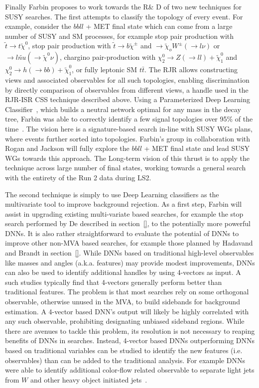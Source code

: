 Finally Farbin proposes to work towards the R\& D of two new
techniques for SUSY searches. The first attempts to classify the
topology of every event. For example, consider the $bb ll$ + MET final
state which can come from a large number of SUSY and SM processes, for
example stop pair production with $\tilde{t} \rightarrow t
\tilde{\chi}^0$, stop pair production with $\tilde{t} \rightarrow b
\tilde{\chi}^\pm$ and $\rightarrow \tilde{\chi}_o W^\pm (\rightarrow l
\nu)$ or $\rightarrow l \tilde{nu} (\rightarrow \tilde{\chi}^0 \nu)$,
chargino pair-production with $\chi_2^0\rightarrow Z (\rightarrow ll)
+ \tilde{\chi}^0_1$ and $\chi_2^0\rightarrow h (\rightarrow bb) +
\tilde{\chi}^0_1$, or fully leptonic SM $t\bar{t}$. The RJR allows
constructing views and associated observables for all such topologies,
enabling discrimination by directly comparison of observables from
different views, a handle used in the RJR-ISR CSS technique described
above. Using a Parameterized Deep Learning Classifier~\cite{}, which
builds a neutral network optimal for any mass in the decay tree,
Farbin was able to correctly identify a few signal topologies over 95\%
of the time~\cite{}. The vision here is a signature-based search
in-line with SUSY WGs plans, where events further sorted into
topologies. Farbin's group in collaboration with Rogan and Jackson
will fully explore the $bb ll$ + MET final state and lead SUSY WGs
towards this approach. The Long-term vision of this thrust is to apply
the technique across large number of final states, working towards a
general search with the entirety of the Run 2 data during LS2.

The second technique is simply to use Deep Learning classifiers as the
multivariate tool to improve background rejection. As a first step,
Farbin will assist in upgrading existing multi-variate based searches,
for example the stop search performed by De described in
section~\ref{}, to the potentially more powerful DNNs. It is also
rather straightforward to evaluate the potential of DNNs to improve
other non-MVA based searches, for example those planned by Hadavand
and Brandt in section~\ref{}. While DNNs based on traditional
high-level observables like masses and angles (a.k.a. features) may
provide modest improvements, DNNs can also be used to identify
additional handles by using 4-vectors as input. A such studies
typically find that 4-vectors generally perform better than
traditional features. The problem is that most searches rely on some
orthogonal observable, otherwise unused in the MVA, to build sidebands
for background estimation. A 4-vector based DNN's output will likely
be highly correlated with any such observable, prohibiting designating
unbiased sideband regions. While there are avenues to tackle this
problem, its resolution is not necessary to reaping benefits of DNNs
in searches. Instead, 4-vector based DNNs outperforming DNNs based on
traditional variables can be studied to identify the new features
(i.e. observables) than can be added to the traditional analysis. For
example DNNs were able to identify additional color-flow related
observable to separate light jets from $W$ and other heavy object
initiated jets~\cite{}.


